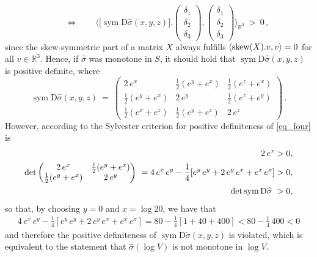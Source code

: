 \documentclass[10pt]{article}
\numberwithin{theoremCounter}{section}
\theoremstyle{plain}
\theoremstyle{definition}
\newcommand{\R}{\mathbb{R}}
\newcommand{\matr}[1]{\begin{pmatrix}#1\end{pmatrix}}
\newcommand{\DD}{\mathrm{D}}
\newcommand{\innerproduct}[1]{\langle #1 \rangle}
\newcommand{\iprod}{\innerproduct}
\DeclareMathOperator{\sym}{sym}
\def\sk{\textnormal{skew}}
\numberwithin{equation}{section}
\begin{document}
\begin{appendix}
\begin{equation}
	\qquad \iff \qquad
	\iprod{\bigl[ \sym \DD \widehat\sigma(x,y,z)\bigr] . \!\! \matr{\delta_1\\\delta_2\\\delta_3} \!,\! \matr{\delta_1\\\delta_2\\\delta_3}}_{\R^3}\ >\ 0\,,
	\end{equation}
since the skew-symmetric part of a matrix $X$ always fulfills $\langle \sk(X) . v, v \rangle = 0$ for all $v \in \R^3$. Hence, if $\widehat \sigma$ was monotone in $S$, it should hold that $\sym \DD \widehat\sigma(x,y,z)$ is positive definite, where
	\begin{equation}\label{eq_four}
	\sym \DD \widehat\sigma(x,y,z)\ =\ \matr{ 2\,e^x & \frac 12(e^y+e^x) & \frac 12(e^z+e^x) \\ \frac 12(e^y+e^x) & 2\,e^y & \frac 12(e^z+e^y) \\ \frac 12(e^x+e^z) & \frac 12(e^y+e^z) & 2\,e^z}\,.
	\end{equation}
However, according to the Sylvester criterion for positive definiteness of \eqref{eq_four} is
	\begin{align}
	2\,e^x &> 0,\notag \\
	\det\matr{2\,e^x & \frac 12(e^y+e^x) \\ \frac 12(e^y+e^x) & 2\,e^y }\ = 4\,e^x\,e^y - \frac 14[e^y\,e^y + 2\,e^y\,e^x + e^x\,e^x] &> 0,\label{eq_five}
	\\
	\det \sym\DD \widehat\sigma\ &> 0,\notag
	\end{align}
so that, by choosing $y=0$ and $x=\log 20$, we have that
\begin{align}
4\,e^x\,e^y - \frac 14[e^y\,e^y + 2\,e^y\,e^x + e^x\,e^x]=80-\frac{1}{4}[1+40+400]<80-\frac{1}{4}\,400<0
\end{align}
and therefore the positive definiteness of $\sym \DD \widetilde\sigma(x,y,z)$ is violated, which is equivalent to the statement that $\widehat \sigma(\log V)$ is not monotone in $\log V$.
%

\end{appendix}
\end{document}
